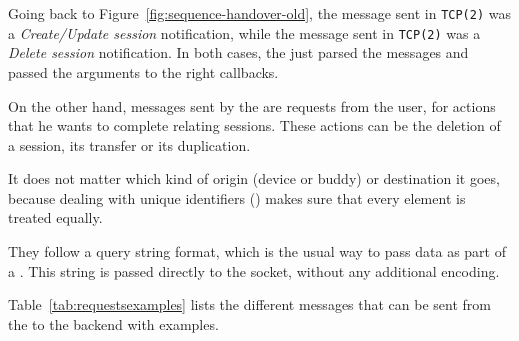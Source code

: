 Going back to Figure~\ref{fig:sequence-handover-old}, the message sent in \texttt{TCP(2)} was a \emph{Create/Update session} notification, while the message sent in \texttt{TCP(2)} was a \emph{Delete session} notification.
In both cases, the  just parsed the messages and passed the arguments to the right  callbacks.

On the other hand, messages sent by the  are requests from the user, for actions that he wants to complete relating sessions.
These actions can be the deletion of a session, its transfer or its duplication.

It does not matter which kind of origin (device or buddy) or destination it goes, because dealing with unique  identifiers () makes sure that every element is treated equally.

They follow a query string format, which is the usual way to pass data as part of a .
This string is passed directly to the  socket, without any additional encoding.

Table~\ref{tab:requestsexamples} lists the different messages that can be sent from the  to the  backend with examples.

